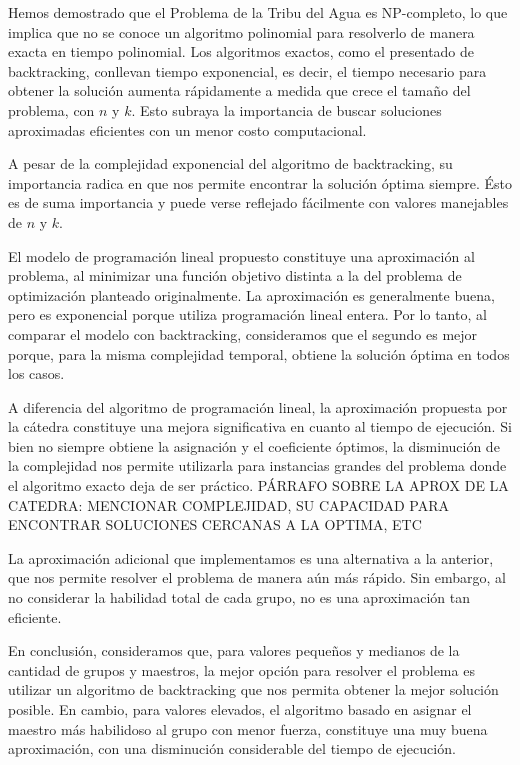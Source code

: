 \documentclass{article}
\begin{document}
Hemos demostrado que el Problema de la Tribu del Agua es NP-completo, lo que implica que no se conoce un algoritmo polinomial para resolverlo de manera exacta en tiempo polinomial. Los algoritmos exactos, como el presentado de backtracking, conllevan tiempo exponencial, es decir, el tiempo necesario para obtener la solución aumenta rápidamente a medida que crece el tamaño del problema, con $n$ y $k$. Esto subraya la importancia de buscar soluciones aproximadas eficientes con un menor costo computacional.

A pesar de la complejidad exponencial del algoritmo de backtracking, su importancia radica en que nos permite encontrar la solución óptima siempre. Ésto es de suma importancia y puede verse reflejado fácilmente con valores manejables de $n$ y $k$.

El modelo de programación lineal propuesto constituye una aproximación al problema, al minimizar una función objetivo distinta a la del problema de optimización planteado originalmente. La aproximación es generalmente buena, pero es exponencial porque utiliza programación lineal entera. Por lo tanto, al comparar el modelo con backtracking, consideramos que el segundo es mejor porque, para la misma complejidad temporal, obtiene la solución óptima en todos los casos. 

A diferencia del algoritmo de programación lineal, la aproximación propuesta por la cátedra constituye una mejora significativa en cuanto al tiempo de ejecución. Si bien no siempre obtiene la asignación y el coeficiente óptimos, la disminución de la complejidad nos permite utilizarla para instancias grandes del problema donde el algoritmo exacto deja de ser práctico.
PÁRRAFO SOBRE LA APROX DE LA CATEDRA: MENCIONAR COMPLEJIDAD, SU CAPACIDAD PARA ENCONTRAR SOLUCIONES CERCANAS A LA OPTIMA, ETC

La aproximación adicional que implementamos es una alternativa a la anterior, que nos permite resolver el problema de manera aún más rápido. Sin embargo, al no considerar la habilidad total de cada grupo, no es una aproximación tan eficiente. 

En conclusión, consideramos que, para valores pequeños y medianos de la cantidad de grupos y maestros, la mejor opción para resolver el problema es utilizar un algoritmo de backtracking que nos permita obtener la mejor solución posible. En cambio, para valores elevados, el algoritmo basado en asignar el maestro más habilidoso al grupo con menor fuerza, constituye una muy buena aproximación, con una disminución considerable del tiempo de ejecución.
\end{document}
